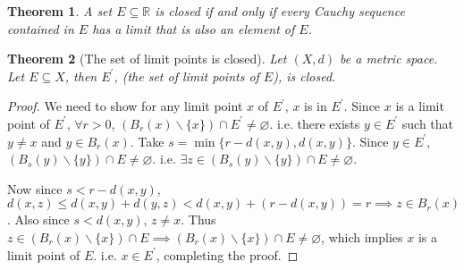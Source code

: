 \documentclass[12pt, lettersize]{article}
\theoremstyle{plain}
\newtheorem{thm}{Theorem}[section]
\theoremstyle{definition}
\theoremstyle{remark}
\newcommand{\R}{\mathbb{R}}
\let\emptyset\varnothing
\begin{document}
\begin{thm}
	A set $E\subseteq \R$ is closed if and only if every Cauchy sequence contained in $E$ has a limit that is also an element of $E$.
\end{thm}

\begin{thm}[The set of limit points is closed]
	Let $(X,d)$ be a metric space. Let $E\subseteq X$, then $E^\prime$, (the set of limit points of $E$), is closed.
\end{thm}
\begin{proof}
	We need to show for any limit point $x$ of $E^\prime$, $x$ is in $E^\prime$. Since $x$ is a limit point of $E^\prime$, $\forall r>0$, $(B_r(x)\backslash\{x\})\cap E^\prime\neq\emptyset$. i.e. there exists $y\in E^\prime$ such that $y\neq x$ and $y\in B_r(x)$. Take $s=\min\{r-d(x,y), d(x,y)\}$. Since $y\in E^\prime$, $(B_s(y)\backslash\{y\})\cap E\neq\emptyset$. i.e. $\exists z\in(B_s(y)\backslash\{y\})\cap E\neq\emptyset$.\smallskip
	
	Now since $s<r-d(x,y)$, $d(x,z)\leq d(x,y)+d(y,z)<d(x,y)+(r-d(x,y))=r\implies z\in B_r(x)$. Also since $s<d(x,y)$, $z\neq x$. Thus $z\in(B_r(x)\backslash\{x\})\cap E\implies (B_r(x)\backslash\{x\})\cap E\neq\emptyset$, which implies $x$ is a limit point of $E$. i.e. $x\in E^\prime$, completing the proof. 
\end{proof}
\end{document}
